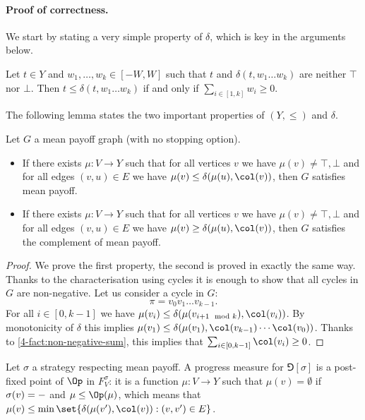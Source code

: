 \paragraph{\bf Proof of correctness.}
We start by stating a very simple property of $\delta$, which is key in the arguments below.

\begin{fact}\label{4-fact:non-negative-sum}
Let $t \in Y$ and $w_1,\dots,w_k \in [-W,W]$ such that $t$ and $\delta(t,w_1 \dots w_k)$ are neither $\top$ nor $\bot$.
Then $t \le \delta(t,w_1 \dots w_k)$ if and only if $\sum_{i \in [1,k]} w_i \ge 0$.
\end{fact}

The following lemma states the two important properties of $(Y,\le)$ and $\delta$.

\begin{lemma}
\label{4-lem:key_property}
Let $G$ a mean payoff graph (with no stopping option).
\begin{itemize}
	\item If there exists $\mu : V \to Y$ such that for all vertices $v$ we have $\mu(v) \neq \top,\bot$
	and for all edges $(v,u) \in E$ we have $\mu(v) \le \delta(\mu(u),\col(v))$,
	then $G$ satisfies mean payoff.
	\item If there exists $\mu : V \to Y$ such that for all vertices $v$ we have $\mu(v) \neq \top,\bot$
	and for all edges $(v,u) \in E$ we have $\mu(v) \ge \delta(\mu(u),\col(v))$,
	then $G$ satisfies the complement of mean payoff.
\end{itemize}
\end{lemma}
\begin{proof}
We prove the first property, the second is proved in exactly the same way.
Thanks to the characterisation using cycles it is enough to show that all cycles in $G$ are non-negative.
Let us consider a cycle in $G$:
\[
\pi = v_0 v_1 \dots v_{k-1}.
\]
For all $i \in [0,k-1]$ we have $\mu(v_i) \le \delta(\mu(v_{i+1 \mod k}),\col(v_i))$.
By monotonicity of $\delta$ this implies $\mu(v_1) \le \delta(\mu(v_1),\col(v_{k-1}) \cdots \col(v_0))$.
Thanks to \cref{4-fact:non-negative-sum}, this implies that $\sum_{i \in [0,k-1]} \col(v_i) \ge 0$.
\end{proof}

Let $\sigma$ a strategy respecting mean payoff. 
A progress measure for $\Game[\sigma]$ is a post-fixed point of $\Op$ in $F^\sigma_V$:
it is a function $\mu : V \to Y$ such that $\mu(v) = \emptyset$ if $\sigma(v) = \mathtt{-}$ and $\mu \le \Op(\mu)$,
which means that $\mu(v) \le \min \set{ \delta(\mu(v'),\col(v)) : (v,v') \in E}$.

